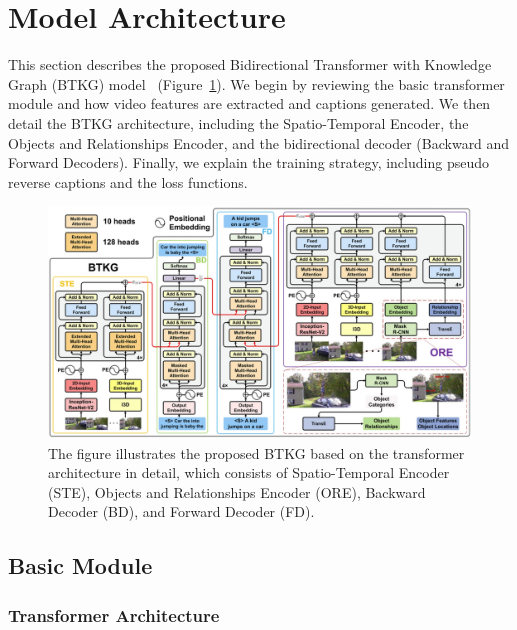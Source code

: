 \section{Model Architecture}
\label{sec:archi}

This section describes the proposed Bidirectional Transformer with Knowledge Graph (BTKG) model~\cite{btkg} (Figure~\ref{fig:archi}). We begin by reviewing the basic transformer module and how video features are extracted and captions generated. We then detail the BTKG architecture, including the Spatio-Temporal Encoder, the Objects and Relationships Encoder, and the bidirectional decoder (Backward and Forward Decoders). Finally, we explain the training strategy, including pseudo reverse captions and the loss functions.

\begin{figure}[H]
    \centering
    \includegraphics[width=1\linewidth]{image/archi.jpg}
    \caption{The figure illustrates the proposed BTKG based on the transformer architecture in detail, which consists of Spatio-Temporal Encoder (STE), Objects and Relationships Encoder (ORE), Backward Decoder (BD), and Forward Decoder (FD).}
    \label{fig:archi}
\end{figure}

\subsection{Basic Module}

\subsubsection{Transformer Architecture}

